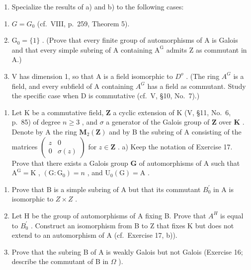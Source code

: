 \begin{enumerate}
\def\labelenumi{\alph{enumi})}
\setcounter{enumi}{2}
\tightlist
\item
  Specialize the results of a) and b) to the following cases:
\end{enumerate}

\begin{enumerate}
\def\labelenumi{(\roman{enumi})}
\item
  \(G = G_{0}\) (cf.~VIII, p.~259, Theorem 5).
\item
  \(\mathrm{G}_0 = \{1\}\) . (Prove that every finite group of automorphisms of A is Galois and that every simple subring of A containing \(\mathrm{A}^{\mathrm{G}}\) admits Z as commutant in A.)
\item
  V has dimension 1, so that A is a field isomorphic to \(D^{o}\) . (The ring \(A^{G}\) is a field, and every subfield of A containing \(A^{G}\) has a field as commutant. Study the specific case when D is commutative (cf.~V, §10, No.~7).)
\end{enumerate}

\begin{enumerate}
\def\labelenumi{\arabic{enumi})}
\setcounter{enumi}{17}
\tightlist
\item
  Let \(\mathrm{K}\) be a commutative field, \(\mathbf{Z}\) a cyclic extension of \(\mathrm{K}\) (V, §11, No.~6, p.~85) of degree \(n \geqslant 3\) , and \(\sigma\) a generator of the Galois group of \(\mathbf{Z}\) over \(\mathbf{K}\) . Denote by A the ring \(\mathbf{M}_2(\mathbf{Z})\) and by B the subring of A consisting of the matrices \(\left( \begin{array}{cc}z & 0\\ 0 & \sigma (z) \end{array} \right)\) for \(z\in \mathbf{Z}\) . a) Keep the notation of Exercise 17. Prove that there exists a Galois group \(\mathbf{G}\) of automorphisms of A such that \(\mathrm{A}^{\mathrm{G}} = \mathrm{K}\) , \((\mathrm{G}:\mathrm{G}_0) = n\) , and \(\mathrm{U}_0(\mathrm{G}) = \mathrm{A}\) .
\end{enumerate}

\begin{enumerate}
\def\labelenumi{\alph{enumi})}
\setcounter{enumi}{1}
\item
  Prove that B is a simple subring of A but that its commutant \(B_{0}^{\prime}\) in A is isomorphic to \(Z \times Z\) .
\item
  Let H be the group of automorphisms of A fixing B. Prove that \(A^{H}\) is equal to \(B_{0}^{\prime}\) . Construct an isomorphism from B to Z that fixes K but does not extend to an automorphism of A (cf.~Exercise 17, b)).
\item
  Prove that the subring B of A is weakly Galois but not Galois (Exercise 16; describe the commutant of B in \(\Omega\) ).
\end{enumerate}

